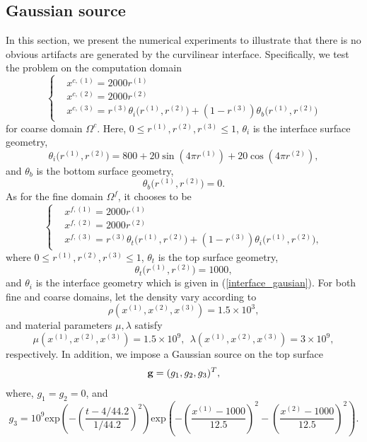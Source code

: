\subsection{Gaussian source}\label{gaussian_source}
In this section, we present the numerical experiments to illustrate that there is no obvious artifacts are generated by the curvilinear interface. Specifically, we test the problem on the computation domain
\begin{equation}
\left\{
\begin{aligned}
& x^{c,(1)} = 2000 r^{(1)}\\
& x^{c,(2)} = 2000 r^{(2)}\\
& x^{c,(3)} = r^{(3)} \theta_i\big(r^{(1)}, r^{(2)}\big) + (1-r^{(3)}) \theta_b\big(r^{(1)},r^{(2)}\big)
\end{aligned}
\right.
\end{equation}
for coarse domain $\Omega^c$. Here, $0\leq r^{(1)}, r^{(2)}, r^{(3)}\leq 1$, $\theta_i$ is the interface surface geometry,
\begin{equation}\label{interface_gausian}
\theta_i\big(r^{(1)},r^{(2)}\big) = 800+20\sin(4\pi r^{(1)})+20\cos(4\pi r^{(2)}),
\end{equation}
and 
$\theta_b$ is the bottom surface geometry,
\begin{equation}
\theta_b\big(r^{(1)},r^{(2)}\big) = 0.
\end{equation}
As for the fine domain $\Omega^f$, it chooses to be
\begin{equation}
\left\{
\begin{aligned}
& x^{f,(1)} = 2000 r^{(1)}\\
& x^{f,(2)} = 2000 r^{(2)}\\
& x^{f,(3)} = r^{(3)}\theta_t\big(r^{(1)},r^{(2)}\big) + (1-r^{(3)})\theta_i\big(r^{(1)},r^{(2)}\big),
\end{aligned}
\right.
\end{equation}
where $0\leq r^{(1)}, r^{(2)}, r^{(3)}\leq 1$, $\theta_t$ is the top surface geometry,
\begin{equation}
\theta_t\big(r^{(1)},r^{(2)}\big) = 1000,
\end{equation}
and $\theta_i$ is the interface geometry which is given in (\ref{interface_gausian}). For both fine and coarse domains, let the density vary according to
\begin{equation}
\rho(x^{(1)},x^{(2)},x^{(3)}) = 1.5\times 10^3,
\end{equation}
and material parameters $\mu, \lambda$ satisfy
\begin{equation}
\mu(x^{(1)},x^{(2)},x^{(3)}) = 1.5\times 10^9,\ \ 
\lambda(x^{(1)},x^{(2)},x^{(3)})  = 3\times 10^9,
\end{equation}
respectively. In addition, we impose a Gaussian source on the top surface
\[{\bf g} = (g_1,g_2,g_3)^T ,\]
where, $g_1 = g_2 = 0$, and 
\[g_3 = 10^9 \text{exp}\left(-\left(\frac{t-4/44.2}{1/44.2}\right)^2\right)\text{exp}\left(-\left(\frac{x^{(1)}-1000}{12.5}\right)^2-\left(\frac{x^{(2)}-1000}{12.5}\right)^2\right).\]

